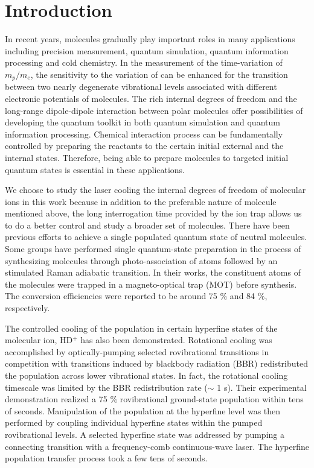 \documentclass[nofootinbib,aip,jcp,reprint]{revtex4-1}
\begin{document}
\section{Introduction}
In recent years, molecules gradually play important roles in many applications including precision measurement\cite{kobayashi2019measurement, andreev2018improved, biesheuvel2016probing}, quantum simulation\cite{ohmori2017special}, quantum information processing\cite{grandstrand:2004, soderberg2009ultracold} and cold chemistry\cite{balakrishnan2016perspective, bohn2017cold}. In the measurement of the time-variation of $m_p/m_e$, the sensitivity to the variation of can be enhanced for the transition between two nearly degenerate vibrational levels associated with different electronic potentials of molecules\cite{demille2008enhanced, kobayashi2019measurement}. The rich internal degrees of freedom and the long-range dipole-dipole interaction between polar molecules offer possibilities of developing the quantum toolkit in both quantum simulation and quantum information processing\cite{wei2011entanglement}. Chemical interaction process can be fundamentally controlled by preparing the reactants to the certain initial external and the internal states\cite{de2011controlling}. Therefore, being able to prepare molecules to targeted initial quantum states is essential in these applications.\par
We choose to study the laser cooling the internal degrees of freedom of molecular ions in this work because in addition to the preferable nature of molecule mentioned above, the long interrogation time provided by the ion trap allows us to do a better control and study a broader set of molecules.
There have been previous efforts to achieve a single populated quantum state of neutral molecules. Some groups have performed single quantum-state preparation in the process of synthesizing molecules through photo-association of atoms followed by an stimulated Raman adiabatic transition\cite{ospelkaus2008efficient, park2015ultracold}. In their works, the constituent atoms of the molecules were trapped in a magneto-optical trap (MOT) before synthesis. The conversion efficiencies were reported to be around 75 $\%$ and 84 $\%$, respectively.\par
The controlled cooling of the population in certain hyperfine states of the molecular ion, HD$^+$ has also been demonstrated\cite{bressel2012manipulation}. Rotational cooling was accomplished by optically-pumping selected rovibrational transitions in competition with transitions induced by blackbody radiation (BBR) redistributed the population across lower vibrational states\cite{schneider2010all}. In fact, the rotational cooling timescale was limited by the BBR redistribution rate ($\sim$ 1 s). Their experimental demonstration realized a 75 $\%$ rovibrational ground-state population within tens of seconds. Manipulation of the population at the hyperfine level was then performed by coupling individual hyperfine states within the pumped rovibrational levels. A selected hyperfine state was addressed by pumping a connecting transition with a frequency-comb continuous-wave laser. The hyperfine population transfer process took a few tens of seconds.\par
\end{document}
